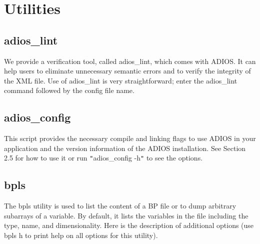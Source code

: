 \chapter{Utilities}

\section{adios\_lint}

We provide a verification tool, called adios\_lint, which comes with ADIOS. It 
can help users to eliminate unnecessary semantic errors and to verify the integrity 
of the XML file. Use of adios\_lint is very straightforward; enter the adios\_lint 
command followed by the config file name.\label{HToc82067529}\label{HToc84890280}\label{HToc212016656}\label{HToc212016898}\label{HToc182553427}

\section{adios\_config}

This script provides the necessary compile and linking flags to use ADIOS in your 
application and the version information of the ADIOS installation.  See Section 
2.5 for how to use it or run \texttt{"}adios\_config -h\texttt{"} to see the options. 
\label{HToc182553428}

\section{bpls}

The bpls utility is used to list the content of a BP file or to dump arbitrary 
subarrays of a variable. By default, it lists the variables in the file including 
the type, name, and dimensionality. Here is the description of additional options 
(use bpls \-{}h to print help on all options for this utility).

